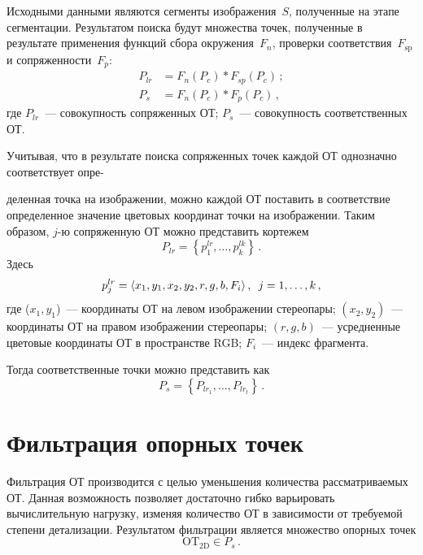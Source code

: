 \begin{multicols}{2}
  Исходными данными являются сегменты изоб\-ра\-жения~$S$, полученные на 
этапе сегментации. Результатом поиска будут множества точек, полученные в 
результате применения функций сбора \mbox{окружения}~$F_n$, проверки 
соответствия~$F_{\mathrm{sp}}$ и сопряженности~$F_p$:
  \begin{align*}
P_{lr} & = F_n(P_c) * F_{sp}(P_c)\,;\\
P_s &= F_n(P_c)  * F_p(P_c)\,,
\end{align*}
где $P_{lr}$~--- совокупность сопряженных ОТ;
$P_{s}$~--- совокупность соответственных ОТ.

  Учитывая, что в результате поиска сопряженных точек каждой ОТ 
однозначно соответствует опре-\linebreak\vspace*{-12pt}

\columnbreak

\noindent
деленная точка на изображении, можно каждой 
ОТ поставить в соответствие определенное значение цветовых координат точки 
на изображении. Таким образом, $j$-ю сопряженную ОТ можно представить 
кортежем
  \begin{equation*}
  P_{lr} = \left \{ p^{lr}_1, \ldots , p_k^{lk}\right\}\,.
  \end{equation*}
  Здесь
  $$
p^{lr}_j = \langle x_1, y_1, x_2, y_2, r, g, b, F_i\rangle\,,\enskip  j = 1, \ldots, k\,,
$$
где ($x_1, y_1$)~--- координаты ОТ на левом изображении стереопары;
$(x_2, y_2)$~--- координаты ОТ на правом изображении стереопары;
$(r, g, b)$~--- усредненные цветовые координаты ОТ в пространстве RGB;
$F_i$~--- индекс фрагмента.

  Тогда соответственные точки можно представить как
  $$
  P_s=\left\{ P_{lr_1},\ldots , P_{lr_t}\right\}\,.
  $$
  
  
  \vspace*{-9pt}
  
\section{Фильтрация опорных точек}
  
  Фильтрация ОТ производится с целью уменьшения количества 
рассматриваемых ОТ. Данная возможность позволяет достаточно гибко 
варьировать вычислительную нагрузку, изменяя количество ОТ в зависимости 
от требуемой степени детализации. Результатом фильтрации является 
множество опорных точек 
  $$
\mathrm{OT}_{\mathrm{2D}}\in P_s\,.$$

\vspace*{-9pt}


\end{multicols}

